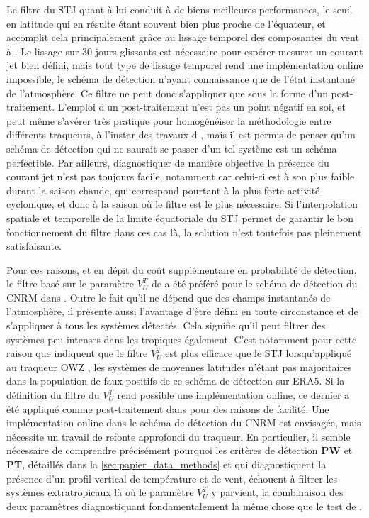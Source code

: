 \documentclass[../main.tex]{subfiles}
\begin{document}
Le filtre du STJ quant à lui conduit à de biens meilleures performances, le seuil en latitude qui en résulte étant souvent bien plus proche de l'équateur, et
accomplit cela principalement grâce au lissage temporel des composantes du vent à . Le lissage sur 30 jours glissants est nécessaire pour espérer
mesurer un courant jet bien défini, mais tout type de lissage temporel rend une implémentation online impossible, le schéma de détection n'ayant connaissance
que de l'état instantané de l'atmosphère. Ce filtre ne peut donc s'appliquer que sous la forme d'un post-traitement. L'emploi d'un post-traitement n'est pas
un point négatif en soi, et peut même s'avérer très pratique pour homogénéiser la méthodologie entre différents traqueurs, à l'instar des travaux d
\textcite{bourdin_intercomparison_2022}, mais il est permis de penser qu'un schéma de détection qui ne saurait se passer d'un tel système est un schéma perfectible.
Par ailleurs, diagnostiquer de manière objective la présence du courant jet n'est pas toujours facile, notamment car celui-ci est à son plus faible durant la
saison chaude, qui correspond pourtant à la plus forte activité cyclonique, et donc à la saison où le filtre est le plus nécessaire. Si l'interpolation spatiale
et temporelle de la limite équatoriale du STJ permet de garantir le bon fonctionnement du filtre dans ces cas là, la solution n'est toutefois pas pleinement
satisfaisante.

Pour ces raisons, et en dépit du coût supplémentaire en probabilité de détection, le filtre basé sur le paramètre $V_U^T$ de \textcite{hart_cyclone_2003} a été
préféré pour le schéma de détection du CNRM dans \textcite{dulac_assessing_2023}. Outre le fait qu'il ne dépend que des champs instantanés de l'atmosphère, il
présente aussi l'avantage d'être défini en toute circonstance et de s'appliquer à tous les systèmes détectés. Cela signifie qu'il peut filtrer des systèmes peu
intenses dans les tropiques également. C'est notamment pour cette raison que \textcite{bourdin_intercomparison_2022} indiquent que le filtre $V_U^T$ est plus
efficace que le STJ lorsqu'appliqué au traqueur OWZ \parencite{tory_importance_2013}, les systèmes de moyennes latitudes n'étant pas majoritaires dans la
population de faux positifs de ce schéma de détection sur ERA5. Si la définition du filtre du $V_U^T$ rend possible une implémentation online, ce dernier a été
appliqué comme post-traitement dans \textcite{dulac_assessing_2023} pour des raisons de facilité. Une implémentation online dans le schéma de détection du CNRM est
envisagée, mais nécessite un travail de refonte approfondi du traqueur. En particulier, il semble nécessaire de comprendre précisément pourquoi les critères de
détection \textbf{PW} et \textbf{PT}, détaillés dans la \cref{sec:papier_data_methods} et qui diagnostiquent la présence d'un profil vertical de température et
de vent, échouent à filtrer les systèmes extratropicaux là où le paramètre $V_U^T$ y parvient, la combinaison des deux paramètres diagnostiquant
fondamentalement la même chose que le test de \citeauthor{hart_cyclone_2003}.
\end{document}
